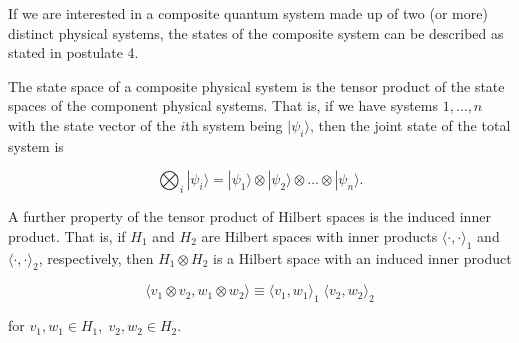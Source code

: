 \documentclass{article}
\begin{document}
    If we are interested in a composite quantum system made up of two (or more) distinct physical systems, the states of the composite system can be described as stated in postulate 4. 

    \begin{theorem}
      The state space of a composite physical system is the tensor product of the state spaces of the component physical systems. That is, if we have systems $1, \ldots, n$ with the state vector of the $i$th system being $|\psi_i \rangle$, then the joint state of the total system is

        \[\bigotimes_i |\psi_i \rangle = |\psi_1 \rangle \otimes |\psi_2 \rangle \otimes \ldots \otimes |\psi_n \rangle.\]
    \end{theorem}

    A further property of the tensor product of Hilbert spaces is the induced inner product. That is, if $H_1$ and $H_2$ are Hilbert spaces with inner products $\langle \cdot, \cdot \rangle_1$ and $\langle \cdot, \cdot \rangle_2$, respectively, then $H_1 \otimes H_2$ is a Hilbert space with an induced inner product

      \[\langle v_1 \otimes v_2 , w_1 \otimes w_2 \rangle \equiv \langle v_1, w_1\rangle_1 \; \langle v_2, w_2 \rangle_2\]

    for $v_1, w_1 \in H_1, \; v_2, w_2 \in H_2$. 
\end{document}
